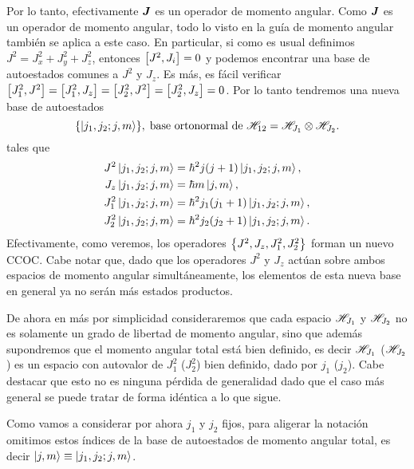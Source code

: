 \documentclass[10pt, a4paper]{article}
\numberwithin{equation}{subsection}
\begin{document}
Por lo tanto, efectivamente $\vb*{J}$ es un operador de momento angular. Como
$\vb*{J}$ es un operador de momento angular, todo lo visto en la guía de
momento angular también se aplica a este caso. En particular, si como es usual
definimos $J^2 = J_x^2 + J_y^2 + J_z^2$, entonces $\comm{J^2}{J_i} = 0$ y
podemos encontrar una base de autoestados comunes a $J^2$ y $J_z$. Es más, es
fácil verificar $\comm{J_1^2}{J^2} = \comm{J_1^2}{J_z} = \comm{J_2^2}{J^2} =
\comm{J_2^2}{J_z} = 0$. Por lo tanto tendremos una nueva base de autoestados
\begin{equation}
  \set{\ket{j_1,j_2;j,m}}, \; \text{base ortonormal de } \Hilbert_{12} =
    \Hilbert_{J_1}\tensor\Hilbert_{J_2}.
\end{equation}
tales que
\begin{align} 
  J^2\ket{j_1,j_2;j,m} &= \hbar^2j(j+1)\ket{j_1,j_2;j,m}, \\
  J_z\ket{j_1,j_2;j,m} &= \hbar m\ket{j,m}, \\
  J_1^2\ket{j_1,j_2;j,m} &= \hbar^2j_1(j_1+1)\ket{j_1,j_2;j,m}, \\
  J_2^2\ket{j_1,j_2;j,m} &= \hbar^2j_2(j_2+1)\ket{j_1,j_2;j,m}.
\end{align}
Efectivamente, como veremos, los operadores $\set{J^2, J_z, J_1^2, J_2^2}$
forman un nuevo CCOC. Cabe notar que, dado que los operadores $J^2$ y $J_z$
actúan sobre ambos espacios de momento angular simultáneamente, los elementos
de esta nueva base en general ya no serán más estados productos.

\bigbreak
De ahora en más por simplicidad consideraremos que cada espacio
$\mathscr{H}_{J_1}$ y $\mathscr{H}_{J_2}$ no es solamente un grado de libertad de
momento angular, sino que además supondremos que el momento angular total
está bien definido, es decir $\mathscr{H}_{J_1}$ ($\mathscr{H}_{J_2}$) es un espacio
con autovalor de $J_1^2$ ($J_2^2$) bien definido, dado por $j_1$ ($j_2$). Cabe
destacar que esto no es ninguna pérdida de generalidad dado que el caso más
general se puede tratar de forma idéntica a lo que sigue.

\bigbreak
{}
\bigbreak

Como vamos a considerar por ahora $j_1$ y $j_2$ fijos, para aligerar la
notación omitimos estos índices de la base de autoestados de momento angular
total, es decir $\ket{j,m} \equiv \ket{j_1,j_2;j,m}$.
\end{document}
